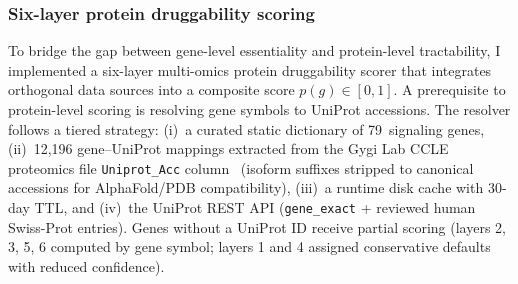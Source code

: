\documentclass[times, twoside, watermark]{zHenriquesLab-StyleBioRxiv}
\begin{document}
\subsubsection*{Six-layer protein druggability scoring}
To bridge the gap between gene-level essentiality and protein-level tractability, I implemented a six-layer multi-omics protein druggability scorer that integrates orthogonal data sources into a composite score $p(g) \in [0,1]$. A prerequisite to protein-level scoring is resolving gene symbols to UniProt accessions. The resolver follows a tiered strategy: (i)~a curated static dictionary of 79~signaling genes, (ii)~12{,}196 gene--UniProt mappings extracted from the Gygi Lab CCLE proteomics file \texttt{Uniprot\_Acc} column~\cite{Nusinow2020} (isoform suffixes stripped to canonical accessions for AlphaFold/PDB compatibility), (iii)~a runtime disk cache with 30-day TTL, and (iv)~the UniProt REST API (\texttt{gene\_exact} + reviewed human Swiss-Prot entries). Genes without a UniProt ID receive partial scoring (layers 2, 3, 5, 6 computed by gene symbol; layers 1 and 4 assigned conservative defaults with reduced confidence).
\end{document}
